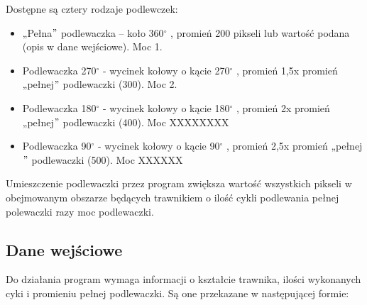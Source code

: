 \documentclass[12pt]{article}
\renewcommand{\_}{\kern-1.5pt\textunderscore\kern-1.5pt}
\begin{document}
Dostępne są cztery rodzaje podlewczek:\par

\begin{itemize}
	\item „Pełna$"$  podlewaczka – koło 360$ ^{\circ} $ , promień 200 pikseli lub wartość podana (opis w dane wejściowe). Moc 1.\par

	\item Podlewaczka 270$ ^{\circ} $  - wycinek kołowy o kącie 270$ ^{\circ} $ , promień 1,5x promień „pełnej$"$  podlewaczki (300). Moc 2.\par

	\item Podlewaczka 180$ ^{\circ} $  - wycinek kołowy o kącie 180$ ^{\circ} $ , promień 2x promień „pełnej$"$  podlewaczki (400). Moc XXXXXXXX\par

	\item Podlewaczka 90$ ^{\circ} $  - wycinek kołowy o kącie 90$ ^{\circ} $ , promień 2,5x promień „pełnej$"$  podlewaczki (500). Moc XXXXXX
\end{itemize}\par

Umieszczenie podlewaczki przez program zwiększa wartość wszystkich pikseli w obejmowanym obszarze będących trawnikiem o ilość cykli podlewania pełnej polewaczki razy moc podlewaczki.\par

\subsection*{Dane wejściowe}
Do działania program wymaga informacji o kształcie trawnika, ilości wykonanych cyki i promieniu pełnej podlewaczki. Są one przekazane w następującej formie:\par
\end{document}
